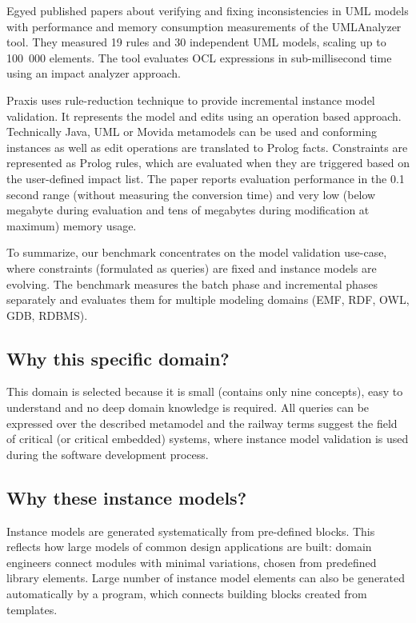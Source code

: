 Egyed published papers about verifying and fixing inconsistencies in UML models
\cite{Egyed-fixingInconsistencies, Egyed-instantConsistency} with performance
and memory consumption measurements \cite{Egyed-incConsistency} of the
UMLAnalyzer tool. They measured 19 rules and 30 independent UML models, scaling
up to 100\ 000 elements. The tool evaluates OCL expressions in sub-millisecond
time using an impact analyzer approach.

Praxis \cite{falleri-praxis} uses rule-reduction technique to provide incremental
instance model validation. It represents the model and edits using an operation
based approach. Technically Java, UML or Movida metamodels can be used and
conforming instances as well as edit operations are translated to Prolog facts.
Constraints are represented as Prolog rules, which are evaluated when they are
triggered based on the user-defined impact list. The paper reports evaluation
performance in the 0.1 second range (without measuring the conversion time) and
very low (below megabyte during evaluation and tens of megabytes during
modification at maximum) memory usage.

To summarize, our benchmark concentrates on the model validation use-case, where
constraints (formulated as queries) are fixed and instance models are evolving.
The benchmark measures the batch phase and incremental phases separately and
evaluates them for multiple modeling domains (EMF, RDF, OWL, GDB, RDBMS).


\subsection{Why this specific domain?}
This domain is selected because it is small (contains only nine concepts), easy
to understand and no deep domain knowledge is required. All queries can be
expressed over the described metamodel and the railway terms suggest the field
of critical (or critical embedded) systems, where instance model validation is
used during the software development process.

\subsection{Why these instance models?}
Instance models are generated systematically from pre-defined blocks. This
reflects how large models of common design applications are built: domain
engineers connect modules with minimal variations, chosen from predefined
library elements. Large number of instance model elements can also be
generated automatically by a program, which connects building blocks created from
templates.

